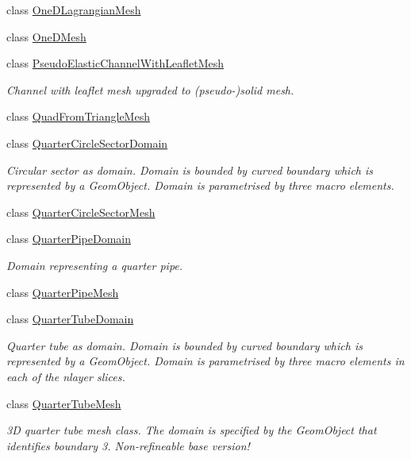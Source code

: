 \begin{DoxyCompactItemize}
class \hyperlink{classoomph_1_1OneDLagrangianMesh}{One\+D\+Lagrangian\+Mesh}
\item 
class \hyperlink{classoomph_1_1OneDMesh}{One\+D\+Mesh}
\item 
class \hyperlink{classoomph_1_1PseudoElasticChannelWithLeafletMesh}{Pseudo\+Elastic\+Channel\+With\+Leaflet\+Mesh}
\begin{DoxyCompactList}\small\item\em Channel with leaflet mesh upgraded to (pseudo-\/)solid mesh. \end{DoxyCompactList}\item 
class \hyperlink{classoomph_1_1QuadFromTriangleMesh}{Quad\+From\+Triangle\+Mesh}
\item 
class \hyperlink{classoomph_1_1QuarterCircleSectorDomain}{Quarter\+Circle\+Sector\+Domain}
\begin{DoxyCompactList}\small\item\em Circular sector as domain. Domain is bounded by curved boundary which is represented by a Geom\+Object. Domain is parametrised by three macro elements. \end{DoxyCompactList}\item 
class \hyperlink{classoomph_1_1QuarterCircleSectorMesh}{Quarter\+Circle\+Sector\+Mesh}
\item 
class \hyperlink{classoomph_1_1QuarterPipeDomain}{Quarter\+Pipe\+Domain}
\begin{DoxyCompactList}\small\item\em Domain representing a quarter pipe. \end{DoxyCompactList}\item 
class \hyperlink{classoomph_1_1QuarterPipeMesh}{Quarter\+Pipe\+Mesh}
\item 
class \hyperlink{classoomph_1_1QuarterTubeDomain}{Quarter\+Tube\+Domain}
\begin{DoxyCompactList}\small\item\em Quarter tube as domain. Domain is bounded by curved boundary which is represented by a Geom\+Object. Domain is parametrised by three macro elements in each of the nlayer slices. \end{DoxyCompactList}\item 
class \hyperlink{classoomph_1_1QuarterTubeMesh}{Quarter\+Tube\+Mesh}
\begin{DoxyCompactList}\small\item\em 3D quarter tube mesh class. The domain is specified by the Geom\+Object that identifies boundary 3. Non-\/refineable base version! \end{DoxyCompactList}\item 

\end{DoxyCompactItemize}
